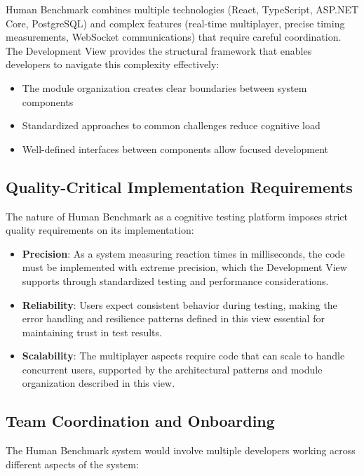 Human Benchmark combines multiple technologies (React, TypeScript, ASP.NET Core, PostgreSQL) and complex features (real-time multiplayer, precise timing measurements, WebSocket communications) that require careful coordination. The Development View provides the structural framework that enables developers to navigate this complexity effectively:

\begin{itemize}
    \item The module organization creates clear boundaries between system components
    \item Standardized approaches to common challenges reduce cognitive load
    \item Well-defined interfaces between components allow focused development
\end{itemize}

\subsection{Quality-Critical Implementation Requirements}

The nature of Human Benchmark as a cognitive testing platform imposes strict quality requirements on its implementation:

\begin{itemize}
    \item \textbf{Precision}: As a system measuring reaction times in milliseconds, the code must be implemented with extreme precision, which the Development View supports through standardized testing and performance considerations.
    
    \item \textbf{Reliability}: Users expect consistent behavior during testing, making the error handling and resilience patterns defined in this view essential for maintaining trust in test results.
    
    \item \textbf{Scalability}: The multiplayer aspects require code that can scale to handle concurrent users, supported by the architectural patterns and module organization described in this view.
\end{itemize}

\subsection{Team Coordination and Onboarding}

The Human Benchmark system would involve multiple developers working across different aspects of the system:

